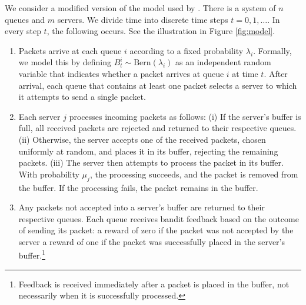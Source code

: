 We consider a modified version of the model used by \cite{DBLP:conf/sigecom/GaitondeT20,DBLP:journals/jacm/GaitondeT23}. There is a system of $n$ queues and $m$ servers. We divide time into discrete time steps $t=0,1, \dots$. In every step $t$, the following occurs. See the illustration in Figure \ref{fig:model}.
\begin{enumerate}
    \item Packets arrive at each queue $i$ according to a fixed probability $\lambda_i$. Formally, we model this by defining $B^i_t \sim \text{Bern}(\lambda_i)$ as an independent random variable that indicates whether a packet arrives at queue $i$ at time $t$. After arrival, each queue that contains at least one packet selects a server to which it attempts to send a single packet.

    \item Each server $j$ processes incoming packets as follows:
    (i) If the server's buffer is full, all received packets are rejected and returned to their respective queues. (ii) Otherwise, the server accepts one of the received packets, chosen uniformly at random, and places it in its buffer, rejecting the remaining packets. 
    (iii) The server then attempts to process the packet in its buffer. With probability $\mu_j$, the processing succeeds, and the packet is removed from the buffer. If the processing fails, the packet remains in the buffer.
        
    \item Any packets not accepted into a server's buffer are returned to their respective queues. Each queue receives bandit feedback based on the outcome of sending its packet: a reward of zero if the packet was not accepted by the server a reward of one if the packet was successfully placed in the server's buffer.\footnote{Feedback 
    is received immediately after a packet is placed in the buffer, not necessarily when it is successfully processed.}
    
\end{enumerate}

